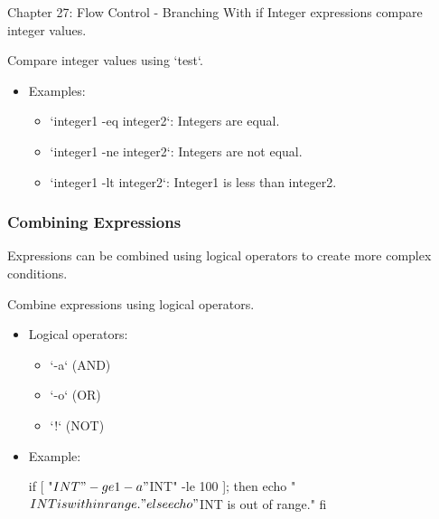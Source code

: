 \begin{notes}{Chapter 27: Flow Control - Branching With if}
    Integer expressions compare integer values.
    
    \begin{highlight}
    
    Compare integer values using `test`.
    
    \begin{itemize}
        \item Examples:
        \begin{itemize}
            \item `integer1 -eq integer2`: Integers are equal.
            \item `integer1 -ne integer2`: Integers are not equal.
            \item `integer1 -lt integer2`: Integer1 is less than integer2.
        \end{itemize}
    \end{itemize}
    
    \end{highlight}
    
    \subsubsection*{Combining Expressions}
    
    Expressions can be combined using logical operators to create more complex conditions.
    
    \begin{highlight}
    
    Combine expressions using logical operators.
    
    \begin{itemize}
        \item Logical operators:
        \begin{itemize}
            \item `-a` (AND)
            \item `-o` (OR)
            \item `!` (NOT)
        \end{itemize}
        \item Example:
    \begin{code}[Shell]
    if [ "$INT" -ge 1 -a "$INT" -le 100 ]; then
        echo "$INT is within range."
    else
        echo "$INT is out of range."
    fi
    \end{code}
    \end{itemize}
    
    \end{highlight}
    

\end{notes}
